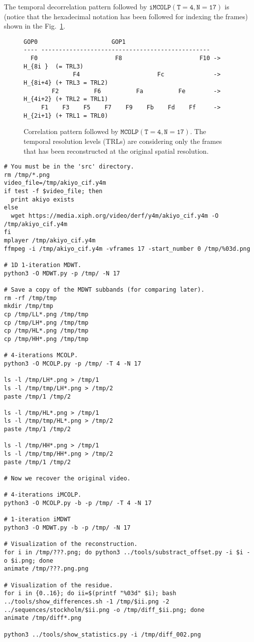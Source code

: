 The temporal decorrelation pattern followed by $\mathtt{iMCOLP(T=4,
  N=17)}$ is (notice that the hexadecimal notation has been followed
for indexing the frames) shown in the Fig.~\ref{fig:PRMC_4_17}.

\begin{figure}
\begin{verbatim}
GOP0                     GOP1
---- ------------------------------------------------
  F0                      F8                      F10 -> H_{8i }  (= TRL3)
              F4                      Fc              -> H_{8i+4} (+ TRL3 = TRL2)
        F2          F6          Fa          Fe        -> H_{4i+2} (+ TRL2 = TRL1)
     F1    F3    F5    F7    F9    Fb    Fd    Ff     -> H_{2i+1} (+ TRL1 = TRL0)
\end{verbatim}
\caption{Correlation pattern followed by $\mathtt{MCOLP(T=4,
    N=17)}$. The temporal resolution levels (TRLs) are considering
  only the frames that has been reconstructed at the original spatial
  resolution.}
\label{fig:PRMC_4_17}
\end{figure}

\begin{verbatim}
# You must be in the 'src' directory.
rm /tmp/*.png
video_file=/tmp/akiyo_cif.y4m
if test -f $video_file; then
  print akiyo exists
else
  wget https://media.xiph.org/video/derf/y4m/akiyo_cif.y4m -O /tmp/akiyo_cif.y4m
fi
mplayer /tmp/akiyo_cif.y4m
ffmpeg -i /tmp/akiyo_cif.y4m -vframes 17 -start_number 0 /tmp/%03d.png

# 1D 1-iteration MDWT.
python3 -O MDWT.py -p /tmp/ -N 17

# Save a copy of the MDWT subbands (for comparing later).
rm -rf /tmp/tmp
mkdir /tmp/tmp
cp /tmp/LL*.png /tmp/tmp
cp /tmp/LH*.png /tmp/tmp
cp /tmp/HL*.png /tmp/tmp
cp /tmp/HH*.png /tmp/tmp

# 4-iterations MCOLP.
python3 -O MCOLP.py -p /tmp/ -T 4 -N 17

ls -l /tmp/LH*.png > /tmp/1
ls -l /tmp/tmp/LH*.png > /tmp/2
paste /tmp/1 /tmp/2

ls -l /tmp/HL*.png > /tmp/1
ls -l /tmp/tmp/HL*.png > /tmp/2
paste /tmp/1 /tmp/2

ls -l /tmp/HH*.png > /tmp/1
ls -l /tmp/tmp/HH*.png > /tmp/2
paste /tmp/1 /tmp/2

# Now we recover the original video.

# 4-iterations iMCOLP.
python3 -O MCOLP.py -b -p /tmp/ -T 4 -N 17

# 1-iteration iMDWT
python3 -O MDWT.py -b -p /tmp/ -N 17

# Visualization of the reconstruction.
for i in /tmp/???.png; do python3 ../tools/substract_offset.py -i $i -o $i.png; done
animate /tmp/???.png.png

# Visualization of the residue.
for i in {0..16}; do ii=$(printf "%03d" $i); bash ../tools/show_differences.sh -1 /tmp/$ii.png -2 ../sequences/stockholm/$ii.png -o /tmp/diff_$ii.png; done
animate /tmp/diff*.png

python3 ../tools/show_statistics.py -i /tmp/diff_002.png
\end{verbatim}

